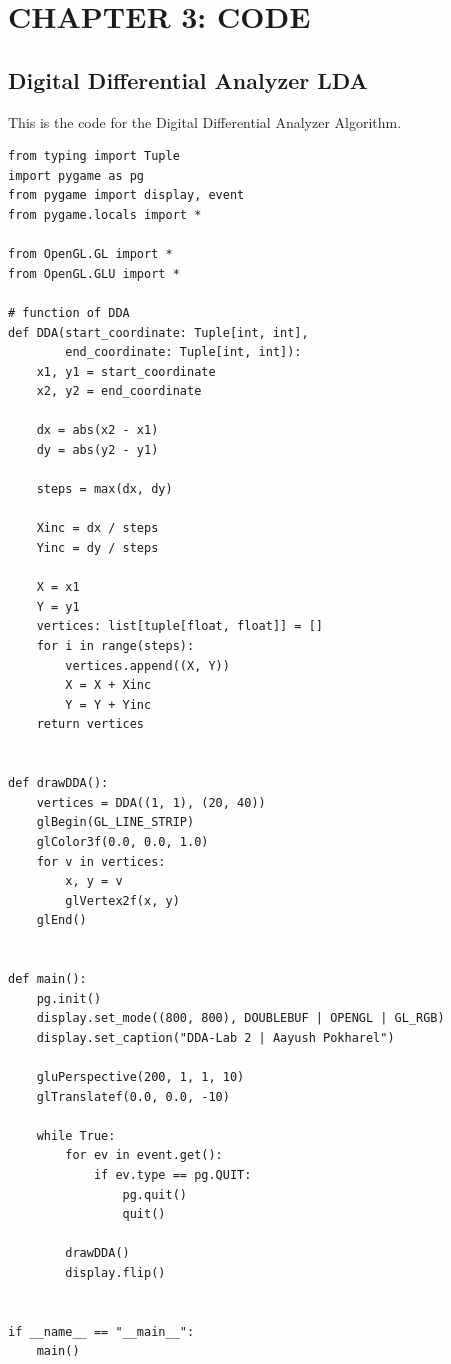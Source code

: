 \documentclass[12pt]{article}
\begin{document}
\section{CHAPTER 3: CODE}

\subsection{Digital Differential Analyzer LDA}
This is the code for the Digital Differential Analyzer Algorithm.
\begin{verbatim}
from typing import Tuple
import pygame as pg
from pygame import display, event
from pygame.locals import *

from OpenGL.GL import *
from OpenGL.GLU import *

# function of DDA
def DDA(start_coordinate: Tuple[int, int],
        end_coordinate: Tuple[int, int]):
    x1, y1 = start_coordinate
    x2, y2 = end_coordinate

    dx = abs(x2 - x1)
    dy = abs(y2 - y1)

    steps = max(dx, dy)

    Xinc = dx / steps
    Yinc = dy / steps

    X = x1
    Y = y1
    vertices: list[tuple[float, float]] = []
    for i in range(steps):
        vertices.append((X, Y))
        X = X + Xinc
        Y = Y + Yinc
    return vertices


def drawDDA():
    vertices = DDA((1, 1), (20, 40))
    glBegin(GL_LINE_STRIP)
    glColor3f(0.0, 0.0, 1.0)
    for v in vertices:
        x, y = v
        glVertex2f(x, y)
    glEnd()


def main():
    pg.init()
    display.set_mode((800, 800), DOUBLEBUF | OPENGL | GL_RGB)
    display.set_caption("DDA-Lab 2 | Aayush Pokharel")

    gluPerspective(200, 1, 1, 10)
    glTranslatef(0.0, 0.0, -10)

    while True:
        for ev in event.get():
            if ev.type == pg.QUIT:
                pg.quit()
                quit()

        drawDDA()
        display.flip()


if __name__ == "__main__":
    main()
\end{verbatim}
\end{document}

